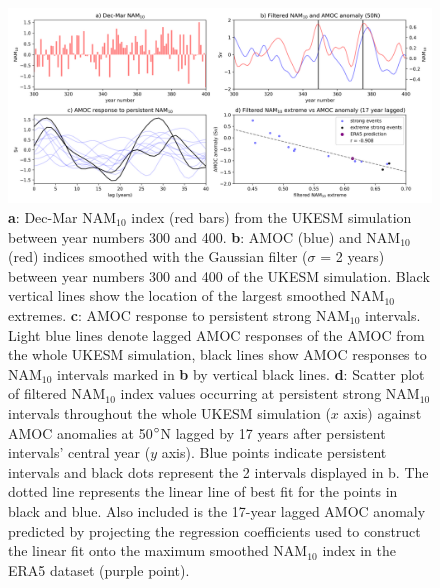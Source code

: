 \newpage
\begin{figure}[h!]
\begin{center}
\noindent\includegraphics[width =\linewidth]{Figures/Figures-surface/AMOC_response_special_events.png} 
\caption[Regression of NAM$_{10}$ extreme magnitude vs AMOC anomaly at 50$\degree$N]{\textbf{a}: Dec-Mar NAM$_{10}$ index (red bars) from the UKESM simulation between year numbers 300 and 400. \textbf{b}: AMOC (blue) and NAM$_{10}$ (red) indices smoothed with the Gaussian filter ($\sigma$ = 2 years) between year numbers 300 and 400 of the UKESM simulation. Black vertical lines show the location of the largest smoothed NAM$_{10}$ extremes. \textbf{c}: AMOC response to persistent strong NAM$_{10}$ intervals. Light blue lines denote lagged AMOC responses of the AMOC from the whole UKESM simulation, black lines show AMOC responses to NAM$_{10}$ intervals marked in \textbf{b} by vertical black lines. \textbf{d}: Scatter plot of filtered NAM$_{10}$ index values occurring at persistent strong NAM$_{10}$ intervals throughout the whole UKESM simulation ($x$ axis) against AMOC anomalies at 50$\degree$N lagged by 17 years after persistent intervals' central year ($y$ axis). Blue points indicate persistent intervals and black dots represent the 2 intervals displayed in b. The dotted line represents the linear line of best fit for the points in black and blue. Also included is the 17-year lagged AMOC anomaly predicted by projecting the regression coefficients used to construct the linear fit onto the maximum smoothed NAM$_{10}$ index in the ERA5 dataset (purple point).}
\label{special_events}
\end{center}
\end{figure}

